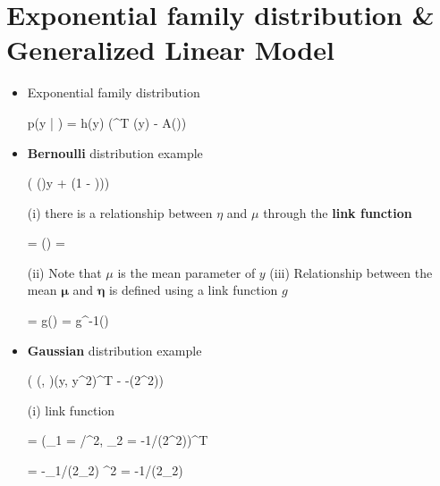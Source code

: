 \section{Exponential family distribution \& Generalized Linear Model}


\begin{itemize}
	  \item Exponential family distribution
		\begin{myalign*}
		    p(\*y | \bm \eta) = h(y) \exp(\bm \eta^T \bm \phi(\*y) - A(\bm \eta))
		\end{myalign*}
      \item {\bf Bernoulli} distribution example
      \begin{myalign*}
	  \rightarrow \exp( \log()y + \log(1 - \mu)))
      \end{myalign*}
      (i) there is a relationship between $\eta$ and $\mu$ through the \textbf{link function}
      \begin{myalign*}
	  \eta = \log() \leftrightarrow \mu = 
      \end{myalign*}
      (ii) Note that $\mu$ is the mean parameter of $y$
      (iii) Relationship between the mean $\bm \mu$ and $\bm \eta$ is defined using a link function $g$
        \begin{myalign*}
            \bm \eta = \*g(\bm \mu) \Leftrightarrow \bm \mu = \*g^{-1}(\bm \eta)
        \end{myalign*}
      \item {\bf Gaussian} distribution example
      \begin{myalign*}
	  \exp( (, )(y, y^2)^T - -\ln(2\pi \sigma^2))
      \end{myalign*}
      (i) link function
      \begin{myalign*}
	  \eta = (\eta_1 = \mu/\sigma^2, \eta_2 = -1/(2\sigma^2))^T
      \end{myalign*}
      \begin{myalign*}
      	  \mu = -\eta_1/(2\eta_2) \text{ ; } \sigma^2 = -1/(2\eta_2)
      \end{myalign*}
      

\end{itemize}
